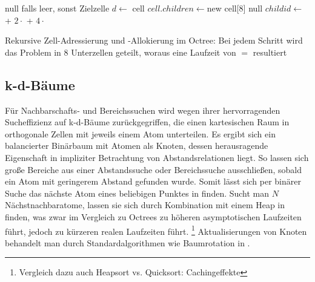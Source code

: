 \begin{algorithm}
  \begin{algorithmic}
    \Result null falls leer, sonst Zielzelle
    \State
    \State $d \gets $
    \State\Return cell
    \EndIf
    \State $cell.children \gets $new cell[8]
    \Else
    \State \Return null
    \EndIf
    \EndIf
    \State $childid \gets $
    + $2\cdot$
    + $4\cdot$
    \State \Return{}
    \EndFunction
  \end{algorithmic}
  \caption[Zell-Adressierung in Octrees]{Rekursive Zell-Adressierung und -Allokierung im Octree: Bei jedem Schritt wird das Problem in 8 Unterzellen geteilt, woraus eine Laufzeit von $=$ resultiert}
  \label{algo:octreeaddressing}
\end{algorithm}


\subsection{k-d-Bäume}
\label{datakdtree}

Für Nachbarschafts- und Bereichssuchen wird wegen ihrer hervorragenden Sucheffizienz auf k-d-Bäume zurückgegriffen, die einen kartesischen Raum in orthogonale Zellen mit jeweils einem Atom unterteilen.
Es ergibt sich ein balancierter Binärbaum mit Atomen als Knoten, dessen herausragende Eigenschaft in impliziter Betrachtung von Abstandsrelationen liegt.
So lassen sich große Bereiche aus einer Abstandssuche oder Bereichssuche ausschließen, sobald ein Atom mit geringerem Abstand gefunden wurde.
Somit lässt sich per binärer Suche das nächste Atom eines beliebigen Punktes in  finden.
Sucht man $N$ Nächstnachbaratome, lassen sie sich durch Kombination mit einem Heap in  finden, was zwar im Vergleich zu Octrees zu höheren asymptotischen Laufzeiten führt, jedoch zu kürzeren realen Laufzeiten führt.
\footnote{Vergleich dazu auch Heapsort vs. Quicksort: Cachingeffekte}
Aktualisierungen von Knoten behandelt man durch Standardalgorithmen wie Baumrotation in .

